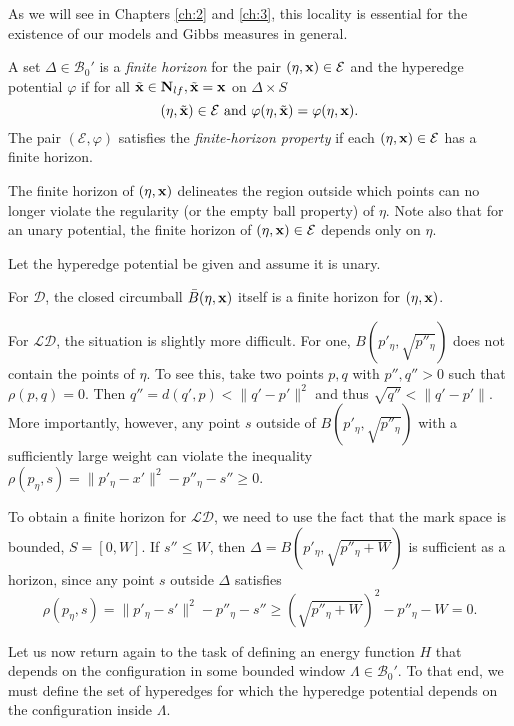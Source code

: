 As we will see in Chapters \ref{ch:2} and \ref{ch:3}, this locality is essential for the existence of our models and Gibbs measures in general. 

\begin{definition}
	A set $\Delta \in \mathcal B_0'$ is a \textit{finite horizon} for the pair $(\eta,{\mathbf{x}}) \in \mathcal E$ and the hyperedge potential $\varphi$ if for all $\tilde{{\mathbf{x}}} \in \mathbf N_{lf}, \tilde{{\mathbf{x}}} = {\mathbf{x}}$ on $\Delta\times S$ 
$$(\eta,\tilde{{\mathbf{x}}})\in\mathcal E \text{ and } \varphi(\eta,\tilde{{\mathbf{x}}}) = \varphi(\eta,{\mathbf{x}}). $$
The pair $(\mathcal E, \varphi)$ satisfies the \textit{finite-horizon property} if each $(\eta,{\mathbf{x}})\in \mathcal E$ has a finite horizon.
\end{definition}

The finite horizon of $(\eta,{\mathbf{x}})$ delineates the region outside which points can no longer violate the regularity (or the empty ball property) of $\eta$. 
Note also that for an unary potential, the finite horizon of $(\eta,{\mathbf{x}})\in \mathcal E$ depends only on $\eta$.

\begin{remark} 
Let the hyperedge potential be given and assume it is unary.

For $\mathcal D$, the closed circumball $\bar B(\eta,{\mathbf{x}})$ itself is a finite horizon for $(\eta,{\mathbf{x}})$.

For $\mathcal {LD}$, the situation is slightly more difficult. For one, $B(p'_\eta, \sqrt{p''_\eta})$ does not contain the points of $\eta$. To see this, take two points $p,q$ with $p'',q''>0$ such that $\rho(p,q)=0$. Then $q'' = d(q',p) < \|q'-p'\|^2$ and thus $\sqrt{q''} < \|q'-p'\|$. More importantly, however, any point $s$ outside of $B(p'_\eta, \sqrt{p''_\eta})$ with a sufficiently large weight can violate the inequality $\rho(p_\eta,s) = \|p'_\eta - x'\|^2 - p''_\eta - s'' \geq 0$. 

To obtain a finite horizon for $\mathcal {LD}$, we need to use the fact that the mark space is bounded, $S=[0,W]$. If $s'' \leq W$, then $\Delta = B(p'_\eta, \sqrt{p''_\eta + W})$ is sufficient as a horizon, since any point $s$ outside $\Delta$ satisfies
$$\rho(p_\eta, s) = \|p'_\eta - s'\|^2 - p''_\eta - s'' \geq (\sqrt{p''_\eta+W})^2-p''_\eta-W = 0.$$ 

\end{remark}

Let us now return again to the task of defining an energy function $H$ that depends on the configuration in some bounded window $\Lambda \in \mathcal B_0'$. To that end, we must define the set of hyperedges for which the hyperedge potential depends on the configuration inside $\Lambda$. 

